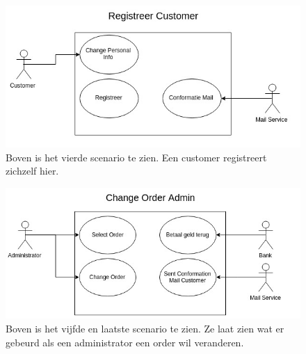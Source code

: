 \documentclass[•]{article}
\begin{document}
\begin{figure}
\centering
\includegraphics[width=13.5cm]{scenario4_registreer.jpeg}
\caption{Boven is het vierde scenario te zien. Een customer registreert zichzelf hier.}
\label{scenario4}
\end{figure}
\begin{figure}
\centering
\includegraphics[width=13.5cm]{scenario5.jpg}
\caption{Boven is het vijfde en laatste scenario te zien. Ze laat zien wat er gebeurd als een administrator een order wil veranderen.}
\label{scenario5}
\end{figure}
\end{document}
